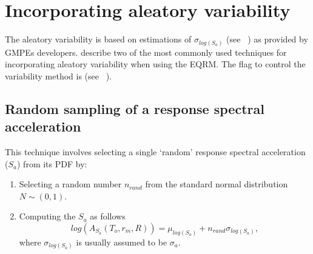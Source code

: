 \section{Incorporating aleatory variability}
\label{attn:uncertainty}

The aleatory variability is based on estimations of
$\sigma_{log(S_a)}$ (see ~) as provided by GMPEs
developers.
 describe
two of the most commonly used techniques for incorporating aleatory
variability when using the EQRM. The flag to control the variability
method is (see
~).

\subsection{Random sampling of a response spectral acceleration}
\label{attn:uncert-randomchoice}

This technique involves selecting a single `random' response
spectral acceleration ($S_a$)
from its PDF by:
\begin{enumerate}
\item Selecting a random number $n_{rand}$ from the standard
normal distribution $ N \sim (0,1)$. \item Computing the $S_a$ as
follows
\begin{equation}
\label{attn:attn-var} log(A_{S_a}(T_o,r_m,R)) = \mu_{log(S_a)} +
n_{rand} \sigma_{log(S_a)},
\end{equation}
where $\sigma_{log(S_a)}$ is usually assumed to be $\sigma_a$.
\end{enumerate}

